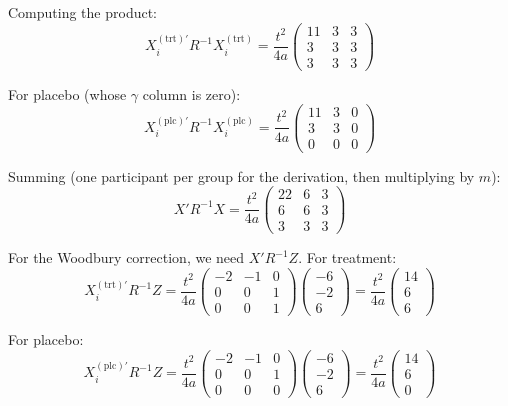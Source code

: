 \documentclass[
  11pt,
]{article}
\begin{document}
Computing the product:
\begin{equation}
  X_i^{(\text{trt})\prime} R^{-1} X_i^{(\text{trt})}
  = \frac{t^2}{4a}\begin{pmatrix}
    11 & 3 & 3 \\ 3 & 3 & 3 \\ 3 & 3 & 3
  \end{pmatrix}
\end{equation}

For placebo (whose \(\gamma\) column is zero):
\begin{equation}
  X_i^{(\text{plc})\prime} R^{-1} X_i^{(\text{plc})}
  = \frac{t^2}{4a}\begin{pmatrix}
    11 & 3 & 0 \\ 3 & 3 & 0 \\ 0 & 0 & 0
  \end{pmatrix}
\end{equation}

Summing (one participant per group for the derivation, then
multiplying by \(m\)):
\begin{equation}
  X'R^{-1}X = \frac{t^2}{4a}\begin{pmatrix}
    22 & 6 & 3 \\ 6 & 6 & 3 \\ 3 & 3 & 3
  \end{pmatrix}
\end{equation}

For the Woodbury correction, we need
\(X'R^{-1}Z\). For treatment:
\[
  X_i^{(\text{trt})\prime}R^{-1}Z
  = \frac{t^2}{4a}\begin{pmatrix}-2&-1&0\\0&0&1\\0&0&1
  \end{pmatrix}
  \begin{pmatrix}-6\\-2\\6\end{pmatrix}
  = \frac{t^2}{4a}\begin{pmatrix}14\\6\\6\end{pmatrix}
\]

For placebo:
\[
  X_i^{(\text{plc})\prime}R^{-1}Z
  = \frac{t^2}{4a}\begin{pmatrix}-2&-1&0\\0&0&1\\0&0&0
  \end{pmatrix}
  \begin{pmatrix}-6\\-2\\6\end{pmatrix}
  = \frac{t^2}{4a}\begin{pmatrix}14\\6\\0\end{pmatrix}
\]
\end{document}
